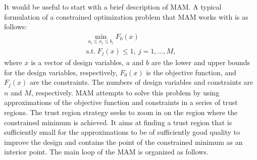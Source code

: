 \documentclass[a4paper]{llncs}
\begin{document}
It would be useful to start with a brief description of MAM. A typical
formulation of a constrained optimization problem that MAM works with is as
follows:
\begin{equation}
  \label{eq:problem}
  \begin{array}{c}
  \min\limits_{a_i \le x_i \le b_i}F_0(x) \\
  \text{s.t.}\ F_j(x) \le 1,\ j=1,\dots ,M,
  \end{array}
\end{equation}
where $x$ is a vector of design variables, $a$ and $b$ are the lower and upper
bounds for the design variables, respectively, $F_0(x)$ is the objective
function, and $F_j(x)$ are the constraints. The numbers of design variables and
constraints are $n$ and $M$, respectively. MAM attempts to solve this problem
by using approximations of the objective function and constraints in a series
of trust regions. The trust region strategy seeks to zoom in on the region
where the constrained minimum is achieved. It aims at finding a trust region
that is sufficiently small for the approximations to be of sufficiently good
quality to improve the design and contains the point of the constrained minimum
as an interior point. The main loop of the MAM is organized as follows.
\end{document}
